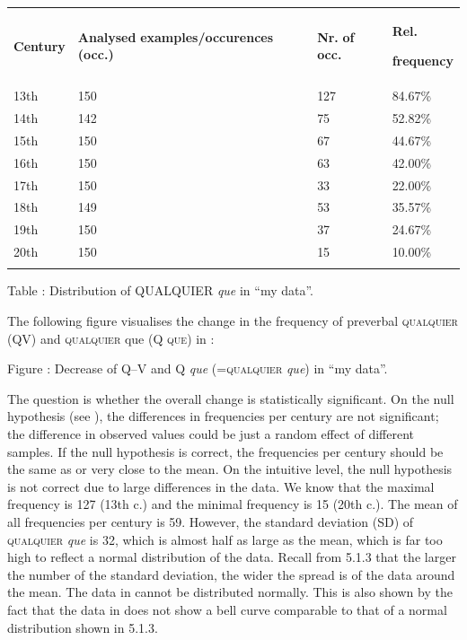 \documentclass[output=paper]{langscibook}
\begin{document}
\begin{tabularx}{\textwidth}{XXXX}

\lsptoprule

 \textbf{Century} & \textbf{Analysed} \textbf{examples/occurences} \textbf{(occ.)} & \textbf{Nr.} \textbf{of} \textbf{occ.} & { \textbf{Rel.} }

 \textbf{frequency}\\
 13th & 150 & 127 & 84.67\%\\
 14th & 142 & 75 & 52.82\%\\
 15th & 150 & 67 & 44.67\%\\
 16th & 150 & 63 & 42.00\%\\
 17th & 150 & 33 & 22.00\%\\
 18th & 149 & 53 & 35.57\%\\
 19th & 150 & 37 & 24.67\%\\
 20th & 150 & 15 & 10.00\%\\
\lspbottomrule
\end{tabularx}
Table : Distribution of QUALQUIER \textit{que} in “my data”.

The following figure visualises the change in the frequency of preverbal \textsc{qualquier} (QV) and \textsc{qualquier} que (\textsc{Q} \textsc{que}) in :

Figure : Decrease of Q–V and Q \textit{que} (=\textsc{qualquier} \textit{que}) in “my data”.

The question is whether the overall change is statistically significant. On the null hypothesis (see ), the differences in frequencies per century are not significant; the difference in observed values could be just a random effect of different samples. If the null hypothesis is correct, the frequencies per century should be the same as or very close to the mean. On the intuitive level, the null hypothesis is not correct due to large differences in the data. We know that the maximal frequency is 127 (13th c.) and the minimal frequency is 15 (20th c.). The mean of all frequencies per century is 59. However, the standard deviation (SD) of \textsc{qualquier} \textit{que} is 32, which is almost half as large as the mean, which is far too high to reflect a normal distribution of the data. Recall from 5.1.3 that the larger the number of the standard deviation, the wider the spread is of the data around the mean. The data in  cannot be distributed normally. This is also shown by the fact that the data in  does not show a bell curve comparable to that of a normal distribution shown in 5.1.3.
\end{document}
